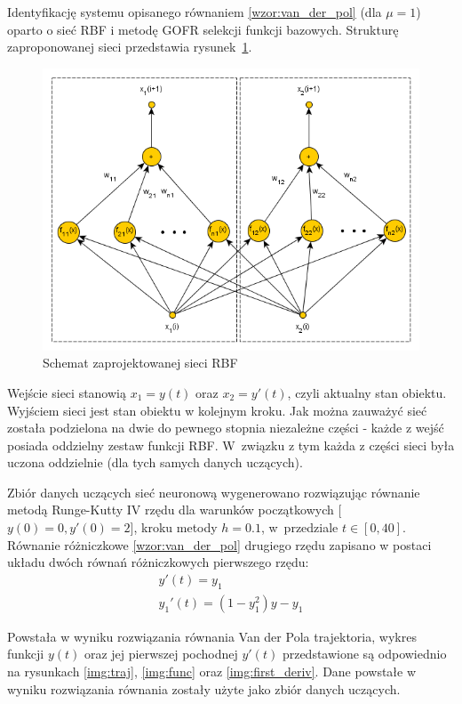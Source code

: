 Identyfikację systemu opisanego równaniem \ref{wzor:van_der_pol} (dla $\mu = 1$) oparto o sieć RBF i metodę GOFR selekcji funkcji bazowych. Strukturę zaproponowanej sieci przedstawia rysunek~\ref{fig:rbf}.
\begin{figure}[ht!]
	\centering
	
	\includegraphics[width = \textwidth]{images/rbf.png}
	\caption{Schemat zaprojektowanej sieci RBF}
	\label{fig:rbf}	

\end{figure}
Wejście sieci stanowią $x_1 = y(t)$ oraz $x_2 = y'(t)$, czyli aktualny stan obiektu. Wyjściem sieci jest stan obiektu w kolejnym kroku. Jak można zauważyć sieć została podzielona na dwie do pewnego stopnia niezależne części - każde z wejść posiada oddzielny zestaw funkcji RBF. W~związku z tym każda z części sieci była uczona oddzielnie (dla tych samych danych uczących). 

Zbiór danych uczących sieć neuronową wygenerowano rozwiązując równanie metodą Runge-Kutty IV rzędu dla warunków początkowych [$y(0)=0,y'(0)=2$], kroku metody $h=0.1$, w~przedziale $t \in [0,40]$. Równanie różniczkowe \ref{wzor:van_der_pol} drugiego rzędu zapisano w postaci układu dwóch równań różniczkowych pierwszego rzędu:
\begin{equation}
	\begin{array}{l}
    y'(t)  = y_1 \\
    y_1'(t) = (1-y_1^2)y-y_1
    \end{array}
\end{equation}

Powstała w wyniku rozwiązania równania Van der Pola trajektoria, wykres funkcji $y(t)$ oraz jej pierwszej pochodnej $y'(t)$ przedstawione są odpowiednio na rysunkach \ref{img:traj}, \ref{img:func} oraz \ref{img:first_deriv}. Dane powstałe w wyniku rozwiązania równania zostały użyte jako zbiór danych uczących.

